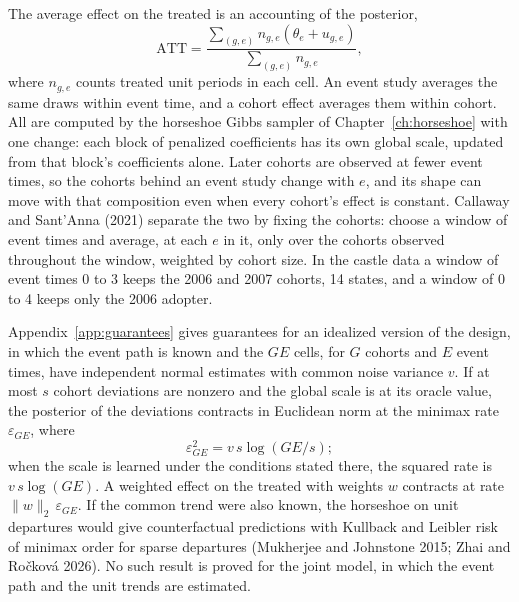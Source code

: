 The average effect on the treated is an accounting of the posterior,
\[
\mathrm{ATT} = \frac{\sum_{(g,e)} n_{g,e}(\theta_e + u_{g,e})}{\sum_{(g,e)} n_{g,e}},
\]
where $n_{g,e}$ counts treated unit periods in each cell. An event study averages the same draws within event time, and a cohort effect averages them within cohort. All are computed by the horseshoe Gibbs sampler of Chapter~\ref{ch:horseshoe} with one change: each block of penalized coefficients has its own global scale, updated from that block's coefficients alone. Later cohorts are observed at fewer event times, so the cohorts behind an event study change with $e$, and its shape can move with that composition even when every cohort's effect is constant. Callaway and Sant'Anna (2021) separate the two by fixing the cohorts: choose a window of event times and average, at each $e$ in it, only over the cohorts observed throughout the window, weighted by cohort size. In the castle data a window of event times 0 to 3 keeps the 2006 and 2007 cohorts, 14 states, and a window of 0 to 4 keeps only the 2006 adopter.

Appendix~\ref{app:guarantees} gives guarantees for an idealized version of the design, in which the event path is known and the $GE$ cells, for $G$ cohorts and $E$ event times, have independent normal estimates with common noise variance $v$. If at most $s$ cohort deviations are nonzero and the global scale is at its oracle value, the posterior of the deviations contracts in Euclidean norm at the minimax rate $\varepsilon_{GE}$, where
\[
\varepsilon_{GE}^2 = v\,s\log(GE/s);
\]
when the scale is learned under the conditions stated there, the squared rate is $v\,s\log(GE)$. A weighted effect on the treated with weights $w$ contracts at rate $\lVert w\rVert_2\,\varepsilon_{GE}$. If the common trend were also known, the horseshoe on unit departures would give counterfactual predictions with Kullback and Leibler risk of minimax order for sparse departures (Mukherjee and Johnstone 2015; Zhai and Ro\v{c}kov\'a 2026). No such result is proved for the joint model, in which the event path and the unit trends are estimated.

